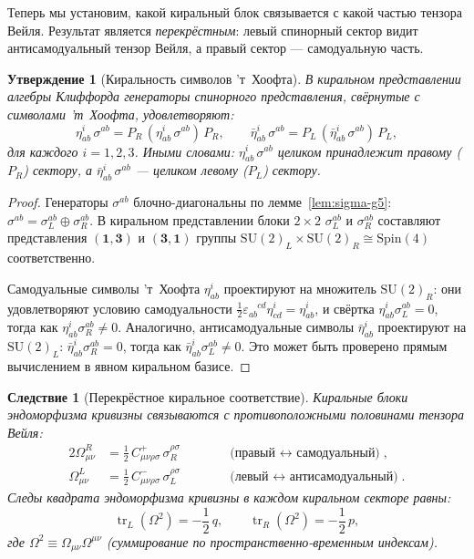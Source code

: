 \documentclass[12pt,a4paper]{article}
\newtheorem{corollary}[theorem]{Следствие}
\newtheorem{proposition}[theorem]{Утверждение}
\theoremstyle{definition}
\theoremstyle{remark}
\newcommand{\tr}{\operatorname{tr}}
\begin{document}
Теперь мы установим, какой киральный блок связывается с какой частью тензора
Вейля.  Результат является \emph{перекрёстным}: левый спинорный сектор
видит антисамодуальный тензор Вейля, а правый сектор ---
самодуальную часть.

\begin{proposition}[Киральность символов 'т~Хоофта]
\label{prop:thooft}
В киральном представлении алгебры Клиффорда генераторы спинорного
представления, свёрнутые с символами 'т~Хоофта, удовлетворяют:
\begin{equation}\label{eq:eta-chirality}
  \eta^i_{ab}\,\sigma^{ab} = P_R\,(\eta^i_{ab}\,\sigma^{ab})\,P_R,
  \qquad
  \bar\eta^i_{ab}\,\sigma^{ab} = P_L\,(\bar\eta^i_{ab}\,\sigma^{ab})\,P_L,
\end{equation}
для каждого $i = 1,2,3$.  Иными словами:
$\eta^i_{ab}\,\sigma^{ab}$ целиком принадлежит правому ($P_R$) сектору,
а $\bar\eta^i_{ab}\,\sigma^{ab}$ --- целиком левому ($P_L$) сектору.
\end{proposition}

\begin{proof}
Генераторы $\sigma^{ab}$ блочно-диагональны по лемме~\ref{lem:sigma-g5}:
$\sigma^{ab} = \sigma^{ab}_L \oplus \sigma^{ab}_R$.  В киральном
представлении блоки $2 \times 2$ $\sigma^{ab}_L$ и $\sigma^{ab}_R$
составляют представления $(\mathbf{1}, \mathbf{3})$ и
$(\mathbf{3}, \mathbf{1})$ группы
$\mathrm{SU}(2)_L \times \mathrm{SU}(2)_R \cong \mathrm{Spin}(4)$
соответственно.

Самодуальные символы 'т~Хоофта $\eta^i_{ab}$ проектируют на множитель
$\mathrm{SU}(2)_R$: они удовлетворяют условию самодуальности
$\frac{1}{2}\varepsilon_{ab}^{\phantom{ab}cd}\eta^i_{cd} = \eta^i_{ab}$,
и свёртка $\eta^i_{ab}\sigma^{ab}_L = 0$, тогда как
$\eta^i_{ab}\sigma^{ab}_R \neq 0$.  Аналогично, антисамодуальные
символы $\bar\eta^i_{ab}$ проектируют на $\mathrm{SU}(2)_L$:
$\bar\eta^i_{ab}\sigma^{ab}_R = 0$, тогда как
$\bar\eta^i_{ab}\sigma^{ab}_L \neq 0$.
Это может быть проверено прямым вычислением в явном киральном базисе.
\end{proof}

\begin{corollary}[Перекрёстное киральное соответствие]
\label{cor:crossed}
Киральные блоки эндоморфизма кривизны связываются с противоположными
половинами тензора Вейля:
\begin{alignat}{2}
  \Omega^R_{\mu\nu} &= \frac{1}{2}\,C^+_{\mu\nu\rho\sigma}\,
  \sigma^{\rho\sigma}_R
  &\qquad &\text{(правый $\leftrightarrow$ самодуальный)},
  \label{eq:OmR} \\[4pt]
  \Omega^L_{\mu\nu} &= \frac{1}{2}\,C^-_{\mu\nu\rho\sigma}\,
  \sigma^{\rho\sigma}_L
  &\qquad &\text{(левый $\leftrightarrow$ антисамодуальный)}.
  \label{eq:OmL}
\end{alignat}
Следы квадрата эндоморфизма кривизны в каждом киральном секторе равны:
\begin{equation}\label{eq:trOsq}
  \tr_L(\Omega^2) = -\frac{1}{2}\,q, \qquad
  \tr_R(\Omega^2) = -\frac{1}{2}\,p,
\end{equation}
где $\Omega^2 \equiv \Omega_{\mu\nu}\Omega^{\mu\nu}$ (суммирование по
пространственно-временным индексам).
\end{corollary}
\end{document}
